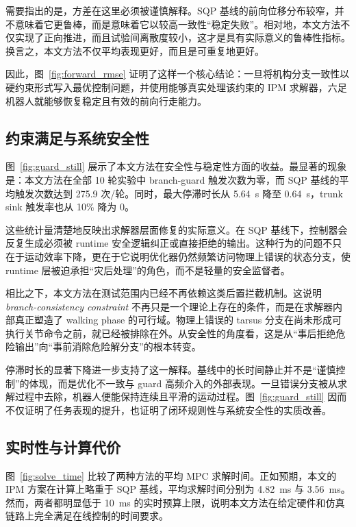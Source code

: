 需要指出的是，方差在这里必须被谨慎解释。SQP 基线的前向位移分布较窄，并不意味着它更鲁棒，而是意味着它以较高一致性“稳定失败”。相对地，本文方法不仅实现了正向推进，而且试验间离散度较小，这才是具有实际意义的鲁棒性指标。换言之，本文方法不仅平均表现更好，而且是可重复地更好。

因此，图~\ref{fig:forward_rmse} 证明了这样一个核心结论：一旦将机构分支一致性以硬约束形式写入最优控制问题，并使用能够真实处理该约束的 IPM 求解器，六足机器人就能够恢复稳定且有效的前向行走能力。

\subsection{约束满足与系统安全性}

图~\ref{fig:guard_still} 展示了本文方法在安全性与稳定性方面的收益。最显著的现象是：本文方法在全部 10 轮实验中 branch-guard 触发次数为零，而 SQP 基线的平均触发次数达到 275.9 次/轮。同时，最大停滞时长从 5.64~s 降至 0.64~s，trunk sink 触发率也从 10\% 降为 0。

这些统计量清楚地反映出求解器层面修复的实际意义。在 SQP 基线下，控制器会反复生成必须被 runtime 安全逻辑纠正或直接拒绝的输出。这种行为的问题不只在于运动效率下降，更在于它说明优化器仍然频繁访问物理上错误的状态分支，使 runtime 层被迫承担“灾后处理”的角色，而不是轻量的安全监督者。

相比之下，本文方法在测试范围内已经不再依赖这类后置拦截机制。这说明 \emph{branch-consistency constraint} 不再只是一个理论上存在的条件，而是在求解器内部真正塑造了 walking phase 的可行域。物理上错误的 tarsus 分支在尚未形成可执行关节命令之前，就已经被排除在外。从安全性的角度看，这是从“事后拒绝危险输出”向“事前消除危险解分支”的根本转变。

停滞时长的显著下降进一步支持了这一解释。基线中的长时间静止并不是“谨慎控制”的体现，而是优化不一致与 guard 高频介入的外部表现。一旦错误分支被从求解过程中去除，机器人便能保持连续且平滑的运动过程。图~\ref{fig:guard_still} 因而不仅证明了任务表现的提升，也证明了闭环规则性与系统安全性的实质改善。

\subsection{实时性与计算代价}

图~\ref{fig:solve_time} 比较了两种方法的平均 MPC 求解时间。正如预期，本文的 IPM 方案在计算上略重于 SQP 基线，平均求解时间分别为 4.82~ms 与 3.56~ms。然而，两者都明显低于 10~ms 的实时预算上限，说明本文方法在给定硬件和仿真链路上完全满足在线控制的时间要求。

